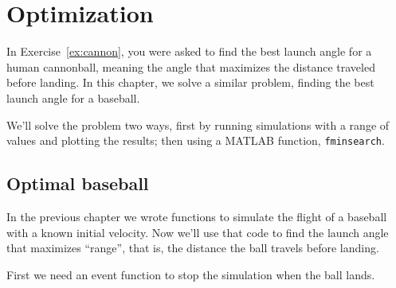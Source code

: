 \documentclass[
]{book}
\numberwithin{Answer}{chapter}
\numberwithin{Exercise}{chapter}
\renewcommand{\vec}[1]{\bm{\mathbf{#1}}}
\newcommand{\uveci}{{\bm{\hat{\textnormal{\bfseries\i}}}}}
\newcommand{\uvecj}{{\bm{\hat{\textnormal{\bfseries\j}}}}}
\newcommand{\uvec}[1]{%
    \ifthenelse{\equal{#1}{i}}%
        {\uveci}{%
    \ifthenelse{\equal{#1}{j}}%
        {\uvecj}{%
    {\bm{\hat{\mathbf{#1}}}}%
}}}
\begin{document}
%
%
%
%
%
%
%


\chapter{Optimization}

In Exercise~\ref{ex:cannon}, you were asked to find the best launch angle for a human cannonball, meaning the angle that maximizes the distance traveled before landing.  In this chapter, we solve a similar problem, finding the best launch angle for a baseball.

We'll solve the problem two ways, first by running simulations with a range of values and plotting the results; then using a MATLAB function, {\tt fminsearch}.


\section{Optimal baseball}

In the previous chapter we wrote functions to simulate the flight of a baseball with a known initial velocity.  Now we'll use that code to find the launch angle that maximizes ``range'', that is, the distance the ball travels before landing.

First we need an event function to stop the simulation when the ball lands.
\end{document}

